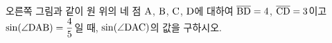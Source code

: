 \noindent\begin{minipage}[t]{0.58\linewidth}\vspace{0pt}\raggedright 오른쪽 그림과 같이 원 위의 네 점 $\mathrm{A}$, $\mathrm{B}$, $\mathrm{C}$, $\mathrm{D}$에 대하여 $\overline{\mathrm{BD}}=4$, $\overline{\mathrm{CD}}=3$이고 $\sin(\angle\mathrm{DAB})=\dfrac{4}{5}$일 때, $\sin(\angle\mathrm{DAC})$의 값을 구하시오.\end{minipage}\hfill\begin{minipage}[t]{0.4\linewidth}\vspace{0pt}\centering \resizebox{\ifdim\width>\linewidth\linewidth\else\width\fi}{!}{}\end{minipage}\par
